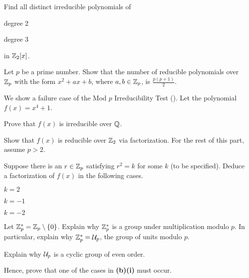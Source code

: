 \begin{problem}
    Find all distinct irreducible polynomials of
    \begin{partquestions}{\alph*}
        \item degree 2
        \item degree 3
    \end{partquestions}
    in $\mathbb{Z}_2[x]$.
\end{problem}

\begin{problem}
    Let $p$ be a prime number. Show that the number of reducible polynomials over $\mathbb{Z}_p$ with the form $x^2 + ax + b$, where $a,b \in \mathbb{Z}_p$, is $\frac{p(p+1)}2$.
\end{problem}

\begin{problem}\label{problem-failure-case-of-mod-p-irreducibility-test}
    We show a failure case of the Mod $p$ Irreducibility Test (). Let the polynomial $f(x) = x^4 + 1$.
    \begin{partquestions}{\alph*}
        \item Prove that $f(x)$ is irreducible over $\mathbb{Q}$.
        \item Show that $f(x)$ is reducible over $\mathbb{Z}_2$ via factorization.\newline
        For the rest of this part, assume $p > 2$.
        \begin{partquestions}{\roman*}
            \item Suppose there is an $r \in \mathbb{Z}_p$ satisfying $r^2 = k$ for some $k$ (to be specified). Deduce a factorization of $f(x)$ in the following cases.
            \begin{partquestions}{\alph*}
                \item $k = 2$
                \item $k = -1$
                \item $k = -2$
            \end{partquestions}
            \item Let $\mathbb{Z}_p^\ast = \mathbb{Z}_p \setminus \{0\}$. Explain why $\mathbb{Z}_p^\ast$ is a group under multiplication modulo $p$. In particular, explain why $\mathbb{Z}_p^\ast = \mathcal{U}_{p}$, the group of units modulo $p$.
            \item Explain why $\mathcal{U}_{p}$ is a cyclic group of even order.
            \item Hence, prove that one of the cases in \textbf{(b)(i)} must occur.
        \end{partquestions}
    \end{partquestions}
\end{problem}
